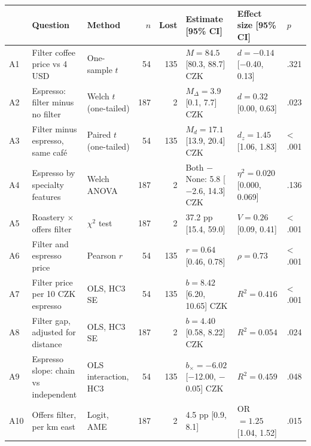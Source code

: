 \begin{tabular}{lllrrlll}
\toprule
 & Question & Method & $n$ & Lost & Estimate [95\% CI] & Effect size [95\% CI] & $p$ \\
\midrule
A1 & Filter coffee price vs 4 USD & One-sample $t$ & 54 & 135 & $M = 84.5$ [80.3, 88.7] CZK & $d = \ensuremath{-}0.14$ [\ensuremath{-}0.40, 0.13] & .321 \\
A2 & Espresso: filter minus no filter & Welch $t$ (one-tailed) & 187 &   2 & $M_\Delta = 3.9$ [0.1, 7.7] CZK & $d = 0.32$ [0.00, 0.63] & .023 \\
A3 & Filter minus espresso, same caf\'e & Paired $t$ (one-tailed) & 54 & 135 & $M_d = 17.1$ [13.9, 20.4] CZK & $d_z = 1.45$ [1.06, 1.83] & < .001 \\
A4 & Espresso by specialty features & Welch ANOVA & 187 &   2 & Both $-$ None: 5.8 [\ensuremath{-}2.6, 14.3] CZK & $\eta^2 = 0.020$ [0.000, 0.069] & .136 \\
A5 & Roastery $\times$ offers filter & $\chi^2$ test & 187 &   2 & 37.2 pp [15.4, 59.0] & $V = 0.26$ [0.09, 0.41] & < .001 \\
A6 & Filter and espresso price & Pearson $r$ & 54 & 135 & $r = 0.64$ [0.46, 0.78] & $\rho = 0.73$ & < .001 \\
A7 & Filter price per 10 CZK espresso & OLS, HC3 SE & 54 & 135 & $b = 8.42$ [6.20, 10.65] CZK & $R^2 = 0.416$ & < .001 \\
A8 & Filter gap, adjusted for distance & OLS, HC3 SE & 187 &   2 & $b = 4.40$ [0.58, 8.22] CZK & $R^2 = 0.054$ & .024 \\
A9 & Espresso slope: chain vs independent & OLS interaction, HC3 & 54 & 135 & $b_{\times} = \ensuremath{-}6.02$ [\ensuremath{-}12.00, \ensuremath{-}0.05] CZK & $R^2 = 0.459$ & .048 \\
A10 & Offers filter, per km east & Logit, AME & 187 &   2 & 4.5 pp [0.9, 8.1] & OR $= 1.25$ [1.04, 1.52] & .015 \\
\bottomrule
\end{tabular}
